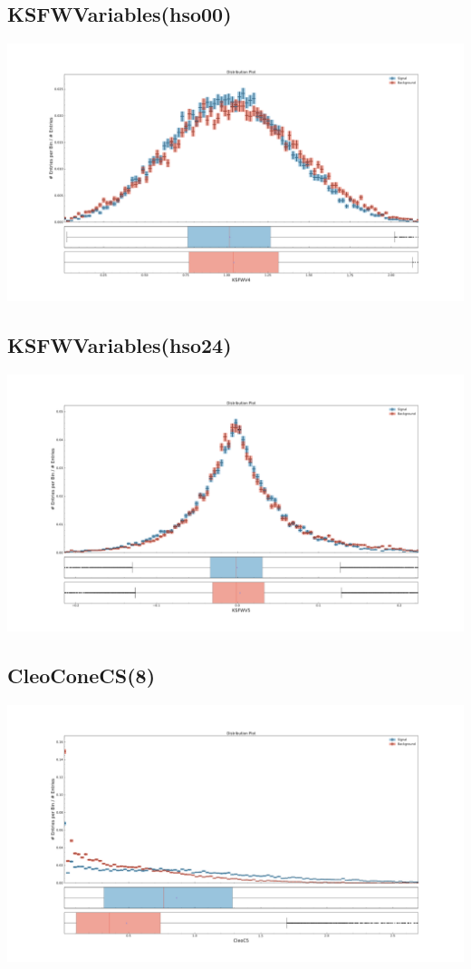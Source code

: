 \documentclass[10pt,a4paper]{article}
\begin{document}
\subsection{KSFWVariables(hso00)}
\begin{center}
\includegraphics[width=1.0\textwidth]{variable_-2520399628779641910.pdf}
\end{center}
\subsection{KSFWVariables(hso24)}
\begin{center}
\includegraphics[width=1.0\textwidth]{variable_-2431290367680671498.pdf}
\end{center}
\subsection{CleoConeCS(8)}
\begin{center}
\includegraphics[width=1.0\textwidth]{variable_-1382178117734643883.pdf}
\end{center}
\end{document}
